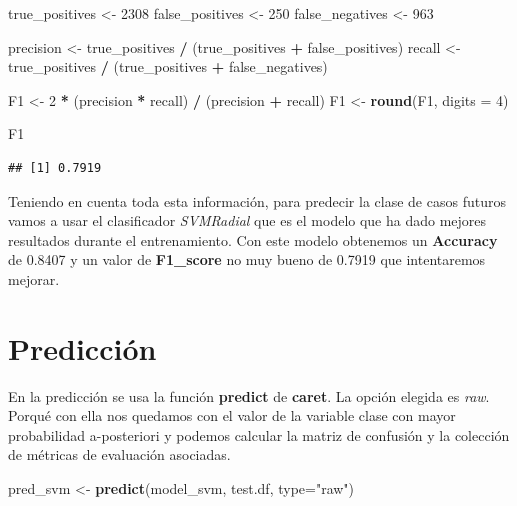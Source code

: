 \documentclass[]{article}
\newenvironment{Shaded}{\begin{snugshade}}{\end{snugshade}}
\newcommand{\DataTypeTok}[1]{\textcolor[rgb]{0.13,0.29,0.53}{#1}}
\newcommand{\DecValTok}[1]{\textcolor[rgb]{0.00,0.00,0.81}{#1}}
\newcommand{\KeywordTok}[1]{\textcolor[rgb]{0.13,0.29,0.53}{\textbf{#1}}}
\newcommand{\NormalTok}[1]{#1}
\newcommand{\OperatorTok}[1]{\textcolor[rgb]{0.81,0.36,0.00}{\textbf{#1}}}
\newcommand{\StringTok}[1]{\textcolor[rgb]{0.31,0.60,0.02}{#1}}
\begin{document}
\begin{Shaded}
\begin{Highlighting}[]
\NormalTok{true_positives <-}\StringTok{ }\DecValTok{2308}
\NormalTok{false_positives <-}\StringTok{ }\DecValTok{250}
\NormalTok{false_negatives <-}\StringTok{ }\DecValTok{963}

\NormalTok{precision <-}\StringTok{ }\NormalTok{true_positives }\OperatorTok{/}\StringTok{ }\NormalTok{(true_positives }\OperatorTok{+}\StringTok{ }\NormalTok{false_positives)}
\NormalTok{recall <-}\StringTok{ }\NormalTok{true_positives }\OperatorTok{/}\StringTok{ }\NormalTok{(true_positives }\OperatorTok{+}\StringTok{ }\NormalTok{false_negatives)}

\NormalTok{F1 <-}\StringTok{ }\DecValTok{2} \OperatorTok{*}\StringTok{ }\NormalTok{(precision }\OperatorTok{*}\StringTok{ }\NormalTok{recall) }\OperatorTok{/}\StringTok{ }\NormalTok{(precision }\OperatorTok{+}\StringTok{ }\NormalTok{recall)}
\NormalTok{F1 <-}\StringTok{ }\KeywordTok{round}\NormalTok{(F1, }\DataTypeTok{digits =} \DecValTok{4}\NormalTok{)}

\NormalTok{F1}
\end{Highlighting}
\end{Shaded}

\begin{verbatim}
## [1] 0.7919
\end{verbatim}

Teniendo en cuenta toda esta información, para predecir la clase de
casos futuros vamos a usar el clasificador \emph{SVMRadial} que es el
modelo que ha dado mejores resultados durante el entrenamiento. Con este
modelo obtenemos un \textbf{Accuracy} de 0.8407 y un valor de
\textbf{F1\_score} no muy bueno de 0.7919 que intentaremos mejorar.

\hypertarget{predicciuxf3n}{%
\section{Predicción}\label{predicciuxf3n}}

En la predicción se usa la función \textbf{predict} de \textbf{caret}.
La opción elegida es \emph{raw}. Porqué con ella nos quedamos con el
valor de la variable clase con mayor probabilidad a-posteriori y podemos
calcular la matriz de confusión y la colección de métricas de evaluación
asociadas.

\begin{Shaded}
\begin{Highlighting}[]
\NormalTok{pred_svm <-}\StringTok{ }\KeywordTok{predict}\NormalTok{(model_svm, test.df, }\DataTypeTok{type=}\StringTok{"raw"}\NormalTok{)}
\end{Highlighting}
\end{Shaded}
\end{document}

